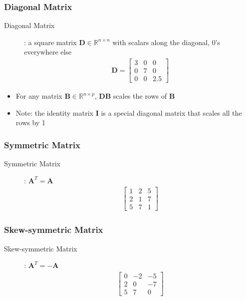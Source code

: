 \documentclass[letterpaper,12pt]{article}
\newcommand{\matr}[1]{\mathbf{#1}}
\begin{document}
\subsubsection{Diagonal Matrix}
\begin{description}
 \item[Diagonal Matrix]: a square matrix $\matr{D} \in \mathbb{R}^{n \times n}$ with scalars along the diagonal, 0's everywhere else
       \begin{align}
        \matr{D} = \begin{bmatrix}
         3 & 0 & 0   \\
         0 & 7 & 0   \\
         0 & 0 & 2.5
        \end{bmatrix}
       \end{align}
\end{description}
\begin{itemize}
 \item For any matrix $\matr{B} \in \mathbb{R}^{n \times p}$, $\matr{D}\matr{B}$ scales the rows of $\matr{B}$
 \item Note: the identity matrix $\matr{I}$ is a special diagonal matrix that scales all the rows by 1
\end{itemize}

\subsubsection{Symmetric Matrix}
\begin{description}
 \item[Symmetric Matrix]: $\matr{A}^T = \matr{A}$
       \begin{align}
        \begin{bmatrix}
         1 & 2 & 5 \\
         2 & 1 & 7 \\
         5 & 7 & 1
        \end{bmatrix}
       \end{align}
\end{description}

\subsubsection{Skew-symmetric Matrix}
\begin{description}
 \item[Skew-symmetric Matrix]: $\matr{A}^T = - \matr{A}$
       \begin{align}
        \begin{bmatrix}
         0 & -2 & -5 \\
         2 & 0  & -7 \\
         5 & 7  & 0
        \end{bmatrix}
       \end{align}
\end{description}
\end{document}
